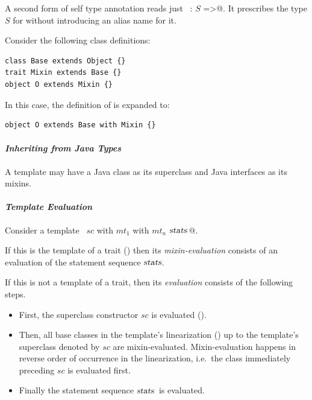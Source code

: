 A second form of self type annotation reads just 
~\lstinline@this: $S$ =>@. It prescribes the type $S$ for \lstinline@this@
without introducing an alias name for it. 

\example Consider the following class definitions:

\begin{lstlisting}
class Base extends Object {}
trait Mixin extends Base {}
object O extends Mixin {}
\end{lstlisting}
In this case, the definition of  is expanded to:
\begin{lstlisting}
object O extends Base with Mixin {}
\end{lstlisting}



\paragraph{\em Inheriting from Java Types} A template may have a Java class as
its superclass and Java interfaces as its mixins. 

\paragraph{\em Template Evaluation}
Consider a template ~\lstinline@$sc$ with $mt_1$ with $mt_n$ {$\mbox{\sl stats}\,$}@.

If this is the template of a trait () then its {\em
mixin-evaluation} consists of an evaluation of the statement sequence
$\mbox{\sl stats}$.

If this is not a template of a trait, then its {\em evaluation}
consists of the following steps.
\begin{itemize}
\item
First, the superclass constructor $sc$ is evaluated ().
\item
Then, all base classes in the template's linearization
() up to the
template's superclass denoted by $sc$ are
mixin-evaluated. Mixin-evaluation happens in reverse order of
occurrence in the linearization, i.e.\ the class immediately preceding
$sc$ is evaluated first.
\item 
Finally the statement sequence $\mbox{\sl stats}\,$ is evaluated.
\end{itemize}

